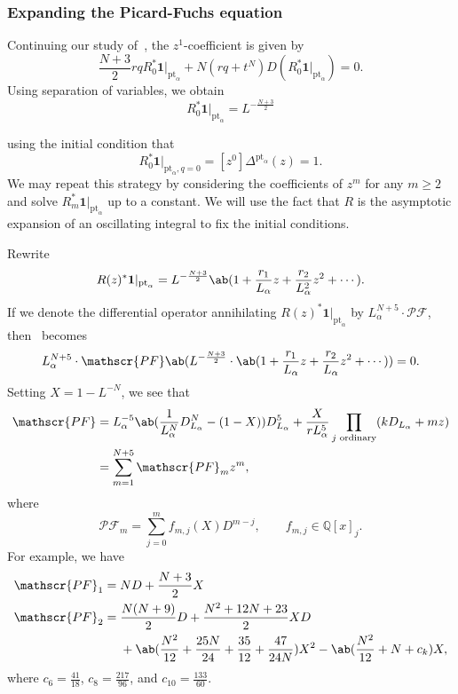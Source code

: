 \documentclass[10pt]{amsart}
\theoremstyle{definition}
\theoremstyle{remark}
\theoremstyle{plain}
\theoremstyle{definition}
\theoremstyle{remark}
\newcommand{\Q}{\mathbb{Q}}
\newcommand{\msc}[1]{\mathscr{#1}}
\newcommand{\mr}[1]{\mathrm{#1}}
\newcommand{\1}{\mathbf{1}}
\newcommand{\2}{\mathbf{2}}
\newcommand{\3}{\mathbf{3}}
\newcommand{\pt}{\mr{pt}}
\numberwithin{equation}{section}
\begin{document}
\subsubsection{Expanding the Picard-Fuchs equation}%
\label{ssub:Expanding the Picard-Fuchs equation}

Continuing our study of~, the $z^1$-coefficient is given by
\[ \frac{N+3}{2} rq R_0^* \1 |_{\pt_{\alpha}} + N (rq + t^N)D(R_0^* \1 |_{\pt_{\alpha}}) = 0. \]
Using separation of variables, we obtain
\begin{equation}\label{eqn:r1level1}
R_0^* \1|_{\pt_{\alpha}} = L^{-\frac{N+3}{2}} 
\end{equation}

using the initial condition that
\[ R_0^*\1|_{\pt_{\alpha},q=0} = [z^0] \Delta^{\pt_{\alpha}}(z) = 1. \]
We may repeat this strategy by considering the coefficients of $z^m$ for any $m \geq 2$ and solve $R_m^*\1|_{\pt_{\alpha}}$ up to a constant. We will use the fact that $R$ is the asymptotic expansion of an oscillating integral to fix the initial conditions. 

Rewrite
\[ R(z)^* \1|_{\pt_{\alpha}} = L^{-\frac{N+3}{2}} \ab(1 + \frac{r_1}{L_{\alpha}}z + \frac{r_2}{L_{\alpha}^2} z^2 + \cdots). \]
If we denote the differential operator annihilating $R(z)^* \1 |_{\pt_{\alpha}}$ by $L_{\alpha}^{N+5} \cdot \msc{PF}$, then~ becomes
\begin{equation}
    L_{\alpha}^{N+5} \cdot \msc{PF} \ab(L^{-\frac{N+3}{2}} \cdot \ab(1 + \frac{r_1}{L_{\alpha}} z + \frac{r_2}{L_{\alpha}} z^2 + \cdots)) = 0.
\end{equation}
Setting $X = 1- L^{-N}$, we see that
\begin{align*}
  \msc{PF} &= L_{\alpha}^{-5} \ab(\frac{1}{L_{\alpha}^N} D_{L_{\alpha}}^N - (1-X))D_{L_{\alpha}}^5 + \frac{X}{r L_{\alpha}^5} \prod_{j\text{ ordinary}} (k D_{L_{\alpha}} + mz) \\
  &= \sum_{m=1}^{N+5} \msc{PF}_m z^m,
\end{align*}
where
\begin{equation}
  \msc{PF}_m = \sum_{j=0}^m f_{m,j}(X)D^{m-j}, \qquad f_{m,j} \in \Q[x]_j.
\end{equation}
For example, we have
\begin{align*}
    \msc{PF}_1 ={}& ND + \frac{N+3}{2} X  \\
    \msc{PF}_2 ={}& \frac{N(N+9)}{2}D + \frac{N^2+12N+23}{2}XD \\
    &+ \ab(\frac{N^2}{12} + \frac{25N}{24} + \frac{35}{12} + \frac{47}{24N})X^2 - \ab(\frac{N^2}{12} + N + c_k) X,
\end{align*}
where $c_6 = \frac{41}{18}$, $c_8 = \frac{217}{96}$, and $c_{10} = \frac{133}{60}$.
\end{document}
